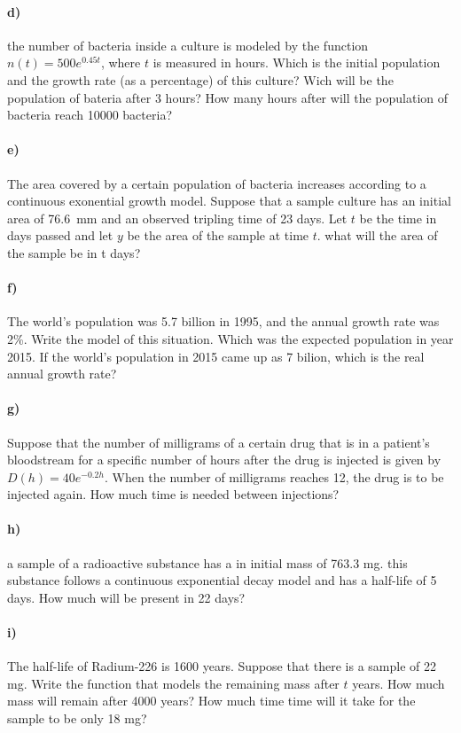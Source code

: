 \documentclass[../main.tex]{subfiles}
\begin{document}
\paragraph{d)} the number of bacteria inside a culture is modeled by the function $n(t) = 500e^{0.45t}$, where $t$ is measured in hours.
Which is the initial population and the growth rate (as a percentage) of this culture?
Wich will be the population of bateria after 3 hours?
How many hours after will the population of bacteria reach \num{10000} bacteria?

\paragraph{e)} The area covered by a certain population of bacteria increases according to a continuous exonential growth model.
Suppose that a sample culture has an initial area of \SI{76.6}{\milli\meter} and an observed tripling time of 23 days.
Let $t$ be the time in days passed and let $y$ be the area of the sample at time $t$.
what will the area of the sample be in t days?

\paragraph{f)} The world's population was 5.7 billion in 1995, and the annual growth rate was 2\%.
Write the model of this situation.
Which was the expected population in year 2015.
If the world's population in 2015 came up as 7 bilion, which is the real annual growth rate?

\paragraph{g)} Suppose that the number of milligrams of a certain drug that is in a patient's bloodstream for a specific number of hours after the drug is injected is given by $D(h)=40e^{-0.2h}.$
When the number of milligrams reaches 12, the drug is to be injected again.
How much time is needed between injections?

\paragraph{h)} a sample of a radioactive substance has a in initial mass of 763.3 mg.
this substance follows a continuous exponential decay model and has a half-life of 5 days.
How much will be present in 22 days?

\paragraph{i)} The half-life of Radium-226 is 1600 years.
Suppose that there is a sample of 22 mg.
Write the function that models the remaining mass after $t$ years.
How much mass will remain after 4000 years?
How much time time will it take for the sample to be only 18 mg?
\end{document}
